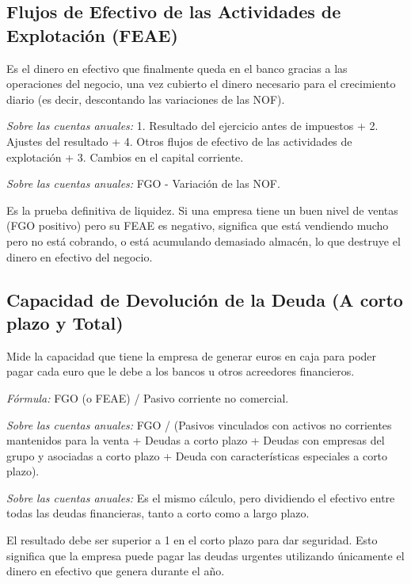 \documentclass[12pt]{book} %
\begin{document}
\hypertarget{flujos-de-efectivo-de-las-actividades-de-explotaciuxf3n-feae}{%
\subsection{Flujos de Efectivo de las Actividades de Explotación
(FEAE)}\label{flujos-de-efectivo-de-las-actividades-de-explotaciuxf3n-feae}}

Es el dinero en efectivo que finalmente queda en el banco gracias a las
operaciones del negocio, una vez cubierto el dinero necesario para el
crecimiento diario (es decir, descontando las variaciones de las NOF).

\emph{Sobre las cuentas anuales:} 1. Resultado del ejercicio antes de
impuestos + 2. Ajustes del resultado + 4. Otros flujos de efectivo de
las actividades de explotación + 3. Cambios en el capital corriente.

\emph{Sobre las cuentas anuales:} FGO - Variación de las NOF.

Es la prueba definitiva de liquidez. Si una empresa tiene un buen nivel
de ventas (FGO positivo) pero su FEAE es negativo, significa que está
vendiendo mucho pero no está cobrando, o está acumulando demasiado
almacén, lo que destruye el dinero en efectivo del negocio.

\hypertarget{capacidad-de-devoluciuxf3n-de-la-deuda-a-corto-plazo-y-total}{%
\subsection{Capacidad de Devolución de la Deuda (A corto plazo y
Total)}\label{capacidad-de-devoluciuxf3n-de-la-deuda-a-corto-plazo-y-total}}

Mide la capacidad que tiene la empresa de generar euros en caja para
poder pagar cada euro que le debe a los bancos u otros acreedores
financieros.

\emph{Fórmula:} FGO (o FEAE) / Pasivo corriente no comercial.

\emph{Sobre las cuentas anuales:} FGO / (Pasivos vinculados con activos
no corrientes mantenidos para la venta + Deudas a corto plazo + Deudas
con empresas del grupo y asociadas a corto plazo + Deuda con
características especiales a corto plazo).

\emph{Sobre las cuentas anuales:} Es el mismo cálculo, pero dividiendo
el efectivo entre todas las deudas financieras, tanto a corto como a
largo plazo.

El resultado debe ser superior a 1 en el corto plazo para dar seguridad.
Esto significa que la empresa puede pagar las deudas urgentes utilizando
únicamente el dinero en efectivo que genera durante el año.
\end{document}
